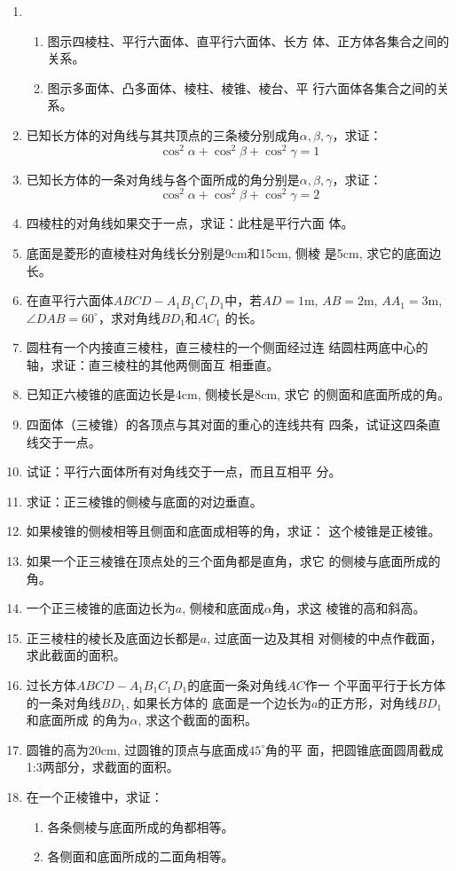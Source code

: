\begin{enumerate}
    \item \begin{enumerate}
        \item 图示四棱柱、平行六面体、直平行六面体、长方
    体、正方体各集合之间的关系。
    \item 图示多面体、凸多面体、棱柱、棱锥、棱台、平
    行六面体各集合之间的关系。
    \end{enumerate}
   
    \item 已知长方体的对角线与其共顶点的三条棱分别成角$\alpha,\beta,\gamma$，求证：
    \[\cos^2\alpha+\cos^2\beta+\cos^2\gamma=1\]
    \item 已知长方体的一条对角线与各个面所成的角分别是$\alpha,\beta,\gamma$，求证：\[\cos^2\alpha+\cos^2\beta+\cos^2\gamma=2\]
    \item 四棱柱的对角线如果交于一点，求证：此柱是平行六面
    体。
    \item 底面是菱形的直棱柱对角线长分别是9cm和15cm, 侧棱
    是5cm, 求它的底面边长。
    \item 在直平行六面体$ABCD-A_1B_1C_1D_1$中，若$AD=1$m,
    $AB=2$m, $AA_1=3$m, $\angle DAB=60^{\circ}$，求对角线$BD_1$和$AC_1$
    的长。
    \item 圆柱有一个内接直三棱柱，直三棱柱的一个侧面经过连
    结圆柱两底中心的轴，求证：直三棱柱的其他两侧面互
    相垂直。
    \item 已知正六棱锥的底面边长是4cm, 侧棱长是8cm, 求它
    的侧面和底面所成的角。
    \item 四面体（三棱锥）的各顶点与其对面的重心的连线共有
    四条，试证这四条直线交于一点。

    \item 试证：平行六面体所有对角线交于一点，而且互相平
分。
\item 求证：正三棱锥的侧棱与底面的对边垂直。
\item 如果棱锥的侧棱相等且侧面和底面成相等的角，求证：
这个棱锥是正棱锥。
\item 如果一个正三棱锥在顶点处的三个面角都是直角，求它
的侧棱与底面所成的角。
\item 一个正三棱锥的底面边长为$a$, 侧棱和底面成$\alpha$角，求这
棱锥的高和斜高。
\item 正三棱柱的棱长及底面边长都是$a$, 过底面一边及其相
对侧棱的中点作截面，求此截面的面积。
\item 过长方体$ABCD-A_1B_1C_1D_1$的底面一条对角线$AC$作一
个平面平行于长方体的一条对角线$BD_1$, 如果长方体的
底面是一个边长为$a$的正方形，对角线$BD_1$和底面所成
的角为$\alpha$, 求这个截面的面积。
\item 圆锥的高为20cm, 过圆锥的顶点与底面成$45^{\circ}$角的平
面，把圆锥底面圆周截成1:3两部分，求截面的面积。
\item 在一个正棱锥中，求证：
\begin{enumerate}
    \item 各条侧棱与底面所成的角都相等。
    \item 各侧面和底面所成的二面角相等。
\end{enumerate}


\end{enumerate}
